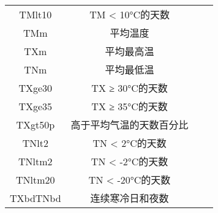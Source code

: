 \begin{longtable}{|cc|cc|}
    TMlt10   & TM < 10°C的天数   &         &                \\
    TMm      & 平均温度           &         &                \\
    TXm      & 平均最高温          &         &                \\
    TNm      & 平均最低温          &         &                \\
    TXge30   & TX ≥ 30°C的天数   &         &                \\
    TXge35   & TX ≥ 35°C的天数   &         &                \\
    TXgt50p  & 高于平均气温的天数百分比   &         &                \\
    TNlt2    & TN < 2°C的天数    &         &                \\
    TNltm2   & TN < -2°C的天数   &         &                \\
    TNltm20  & TN < -20°C的天数  &         &                \\
    TXbdTNbd & 连续寒冷日和夜数       &         &                \\
    \bottomrule
\end{longtable}
